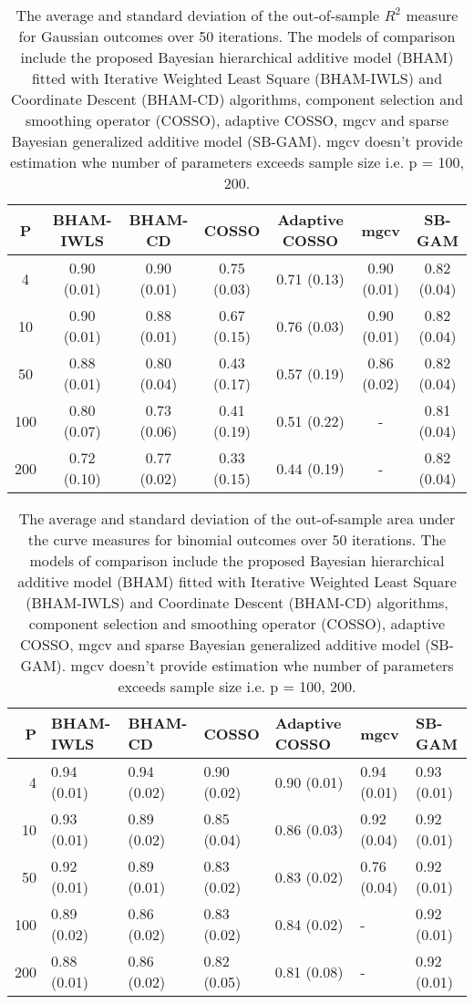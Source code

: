 \documentclass[AMA,STIX1COL,]{WileyNJD-v2}
\begin{document}
\newpage

\begin{table}[ht]
\centering
\begin{tabular}{ccccccc}
  \hline
P & BHAM-IWLS & BHAM-CD & COSSO & Adaptive COSSO & mgcv & SB-GAM \\ 
  \hline
  4 & 0.90 (0.01) & 0.90 (0.01) & 0.75 (0.03) & 0.71 (0.13) & 0.90 (0.01) & 0.82 (0.04) \\ 
   10 & 0.90 (0.01) & 0.88 (0.01) & 0.67 (0.15) & 0.76 (0.03) & 0.90 (0.01) & 0.82 (0.04) \\ 
   50 & 0.88 (0.01) & 0.80 (0.04) & 0.43 (0.17) & 0.57 (0.19) & 0.86 (0.02) & 0.82 (0.04) \\ 
  100 & 0.80 (0.07) & 0.73 (0.06) & 0.41 (0.19) & 0.51 (0.22) & - & 0.81 (0.04) \\ 
  200 & 0.72 (0.10) & 0.77 (0.02) & 0.33 (0.15) & 0.44 (0.19) & - & 0.82 (0.04) \\ 
   \hline
\end{tabular}
\caption{The average and standard deviation of the out-of-sample $R^2$ measure for Gaussian outcomes over 50 iterations. The models of comparison include the proposed Bayesian hierarchical additive model (BHAM) fitted with Iterative Weighted Least Square (BHAM-IWLS) and Coordinate Descent (BHAM-CD) algorithms, component selection and smoothing operator (COSSO), adaptive COSSO, mgcv and sparse Bayesian generalized additive model (SB-GAM). mgcv doesn't provide estimation whe number of parameters exceeds sample size i.e. p = 100, 200.} 
\label{tab:gaus}
\end{table}

\begin{table}[ht]
\centering
\begin{tabular}{rllllll}
  \hline
P & BHAM-IWLS & BHAM-CD & COSSO & Adaptive COSSO & mgcv & SB-GAM \\ 
  \hline
  4 & 0.94 (0.01) & 0.94 (0.02) & 0.90 (0.02) & 0.90 (0.01) & 0.94 (0.01) & 0.93 (0.01) \\ 
   10 & 0.93 (0.01) & 0.89 (0.02) & 0.85 (0.04) & 0.86 (0.03) & 0.92 (0.04) & 0.92 (0.01) \\ 
   50 & 0.92 (0.01) & 0.89 (0.01) & 0.83 (0.02) & 0.83 (0.02) & 0.76 (0.04) & 0.92 (0.01) \\ 
  100 & 0.89 (0.02) & 0.86 (0.02) & 0.83 (0.02) & 0.84 (0.02) & - & 0.92 (0.01) \\ 
  200 & 0.88 (0.01) & 0.86 (0.02) & 0.82 (0.05) & 0.81 (0.08) & - & 0.92 (0.01) \\ 
   \hline
\end{tabular}
\caption{The average and standard deviation of the out-of-sample area under the curve measures for binomial outcomes over 50 iterations. The models of comparison include the proposed Bayesian hierarchical additive model (BHAM) fitted with Iterative Weighted Least Square (BHAM-IWLS) and Coordinate Descent (BHAM-CD) algorithms, component selection and smoothing operator (COSSO), adaptive COSSO, mgcv and sparse Bayesian generalized additive model (SB-GAM). mgcv doesn't provide estimation whe number of parameters exceeds sample size i.e. p = 100, 200.} 
\label{tab:bin_auc}
\end{table}
\end{document}
